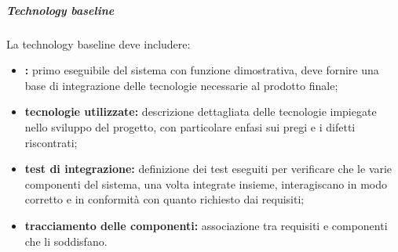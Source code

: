 					\subparagraph{Technology baseline}
						La technology baseline deve includere:
						\begin{itemize}
							\item \textbf{:} primo eseguibile del sistema con funzione dimostrativa, deve fornire una base di integrazione delle tecnologie necessarie al prodotto finale;
							\item \textbf{tecnologie utilizzate:} descrizione dettagliata delle tecnologie impiegate nello sviluppo del progetto, con particolare enfasi sui pregi e i difetti riscontrati;
							\item \textbf{test di integrazione:} definizione dei test eseguiti per verificare che le varie componenti del sistema, una volta integrate insieme, interagiscano in modo corretto e in conformità con quanto richiesto dai requisiti;
							\item \textbf{tracciamento delle componenti:} associazione tra requisiti e componenti che li soddisfano.
						\end{itemize}


